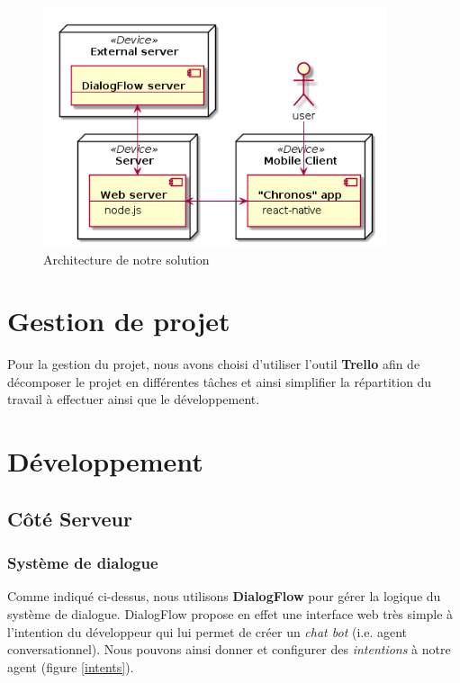 \begin{figure}[H]
	\centering
		\centering
		\includegraphics[width=0.9\textwidth]{../docs/conception/build/architectureDiagram.png}
        \caption{Architecture de notre solution}
        \label{archi}
\end{figure}


\section{Gestion de projet}

Pour la gestion du projet, nous avons choisi d'utiliser l'outil \textbf{Trello}\cite{trello} afin de décomposer le projet en différentes tâches et ainsi simplifier
la répartition du travail à effectuer ainsi que le développement.

\section{Développement}

\subsection{Côté Serveur}

\subsubsection{Système de dialogue}

Comme indiqué ci-dessus, nous utilisons \textbf{DialogFlow} pour gérer la logique du système de dialogue. DialogFlow propose en effet une interface web très simple à
l'intention du développeur qui lui permet de créer un \emph{chat bot} (i.e. agent conversationnel). Nous pouvons ainsi donner et configurer des \emph{intentions} à notre agent (figure \ref{intents}).\\

